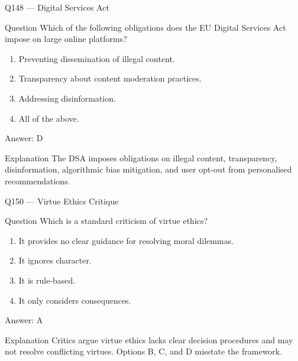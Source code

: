 \documentclass[aspectratio=169,8pt]{beamer}
\begin{document}
\begin{frame}{Q148 --- Digital Services Act}
\begin{block}{Question}
Which of the following obligations does the EU Digital Services Act impose on large online platforms?
\begin{enumerate}
\item Preventing dissemination of illegal content.
\item Transparency about content moderation practices.
\item Addressing disinformation.
\item All of the above.
\end{enumerate} 	\end{block}
\begin{exampleblock}{Answer: D}\end{exampleblock}
\begin{block}{Explanation}
The DSA imposes obligations on illegal content, transparency, disinformation, algorithmic bias mitigation, and user opt-out from personalised recommendations.
\end{block}
\end{frame}



\begin{frame}{Q150 --- Virtue Ethics Critique}
\begin{block}{Question}
Which is a standard criticism of virtue ethics?
\begin{enumerate}
\item It provides no clear guidance for resolving moral dilemmas.
\item It ignores character.
\item It is rule-based.
\item It only considers consequences.
\end{enumerate} 	\end{block}
\begin{exampleblock}{Answer: A}\end{exampleblock}
\begin{block}{Explanation}
Critics argue virtue ethics lacks clear decision procedures and may not resolve conflicting virtues. Options B, C, and D misstate the framework.
\end{block}
\end{frame}
\end{document}
